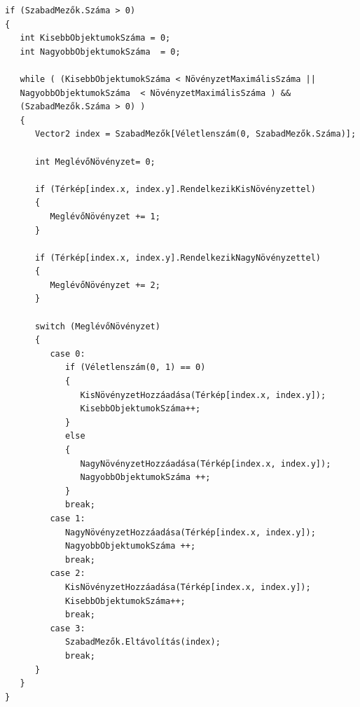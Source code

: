 \begin{verbatim}
if (SzabadMezők.Száma > 0)
{
   int KisebbObjektumokSzáma = 0;
   int NagyobbObjektumokSzáma  = 0;

   while ( (KisebbObjektumokSzáma < NövényzetMaximálisSzáma ||
   NagyobbObjektumokSzáma  < NövényzetMaximálisSzáma ) && 
   (SzabadMezők.Száma > 0) )
   {
      Vector2 index = SzabadMezők[Véletlenszám(0, SzabadMezők.Száma)];
                
      int MeglévőNövényzet= 0;

      if (Térkép[index.x, index.y].RendelkezikKisNövényzettel)
      {
         MeglévőNövényzet += 1;
      }
      
      if (Térkép[index.x, index.y].RendelkezikNagyNövényzettel)
      {
         MeglévőNövényzet += 2;
      }

      switch (MeglévőNövényzet)
      {
         case 0:
            if (Véletlenszám(0, 1) == 0)
            {
               KisNövényzetHozzáadása(Térkép[index.x, index.y]);
               KisebbObjektumokSzáma++;
            }
            else
            {
               NagyNövényzetHozzáadása(Térkép[index.x, index.y]);
               NagyobbObjektumokSzáma ++;
            }
            break;
         case 1:
            NagyNövényzetHozzáadása(Térkép[index.x, index.y]);
            NagyobbObjektumokSzáma ++;
            break;
         case 2:
            KisNövényzetHozzáadása(Térkép[index.x, index.y]);
            KisebbObjektumokSzáma++;
            break;
         case 3:
            SzabadMezők.Eltávolítás(index);
            break;
      }
   }
}
\end{verbatim}